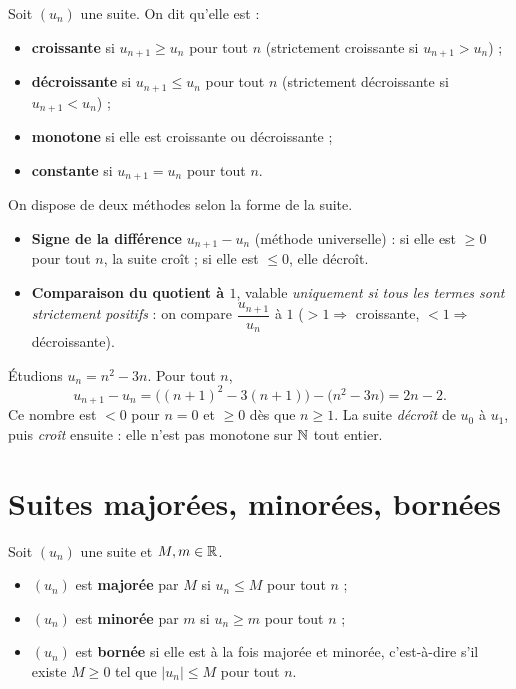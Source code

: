 \begin{definition}
Soit $(u_n)$ une suite. On dit qu'elle est :
\begin{itemize}
  \item \textbf{croissante} si $u_{n+1}\ge u_n$ pour tout $n$ (strictement croissante
        si $u_{n+1}>u_n$) ;
  \item \textbf{décroissante} si $u_{n+1}\le u_n$ pour tout $n$ (strictement
        décroissante si $u_{n+1}<u_n$) ;
  \item \textbf{monotone} si elle est croissante ou décroissante ;
  \item \textbf{constante} si $u_{n+1}=u_n$ pour tout $n$.
\end{itemize}
\end{definition}

\begin{aretenir}
On dispose de deux méthodes selon la forme de la suite.
\begin{itemize}
  \item \textbf{Signe de la différence} $u_{n+1}-u_n$ (méthode universelle) :
        si elle est $\ge 0$ pour tout $n$, la suite croît ; si elle est $\le 0$, elle
        décroît.
  \item \textbf{Comparaison du quotient à $1$}, valable \emph{uniquement si tous les
        termes sont strictement positifs} : on compare $\dfrac{u_{n+1}}{u_n}$ à $1$
        ($>1\Rightarrow$ croissante, $<1\Rightarrow$ décroissante).
\end{itemize}
\end{aretenir}

\begin{exemple}
Étudions $u_n=n^2-3n$. Pour tout $n$,
\[ u_{n+1}-u_n=\big((n+1)^2-3(n+1)\big)-\big(n^2-3n\big)=2n-2. \]
Ce nombre est $<0$ pour $n=0$ et $\ge 0$ dès que $n\ge 1$. La suite \emph{décroît}
de $u_0$ à $u_1$, puis \emph{croît} ensuite : elle n'est pas monotone sur $\mathbb{N}$ tout entier.
\end{exemple}

\section{Suites majorées, minorées, bornées}

\begin{definition}
Soit $(u_n)$ une suite et $M,m\in\mathbb{R}$.
\begin{itemize}
  \item $(u_n)$ est \textbf{majorée} par $M$ si $u_n\le M$ pour tout $n$ ;
  \item $(u_n)$ est \textbf{minorée} par $m$ si $u_n\ge m$ pour tout $n$ ;
  \item $(u_n)$ est \textbf{bornée} si elle est à la fois majorée et minorée,
        c'est-à-dire s'il existe $M\ge 0$ tel que $|u_n|\le M$ pour tout $n$.
\end{itemize}
\end{definition}


